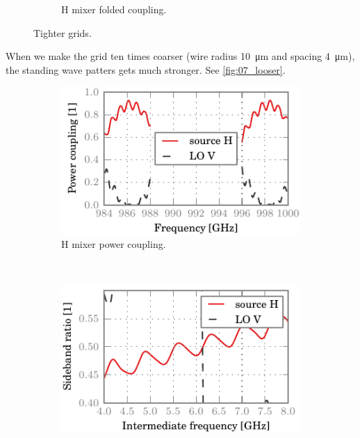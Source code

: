 \begin{figure}[hbtp]
\begin{subfigure}[b]{.5\textwidth}
        \caption{H mixer folded coupling.}
    \end{subfigure}%
    \caption{Tighter grids.}
    \label{fig:06_tighter}
\end{figure}

When we make the grid ten times coarser (wire radius \SI{10}{\micro\meter} and spacing \SI{4}{\micro\meter}), the standing wave patters gets much stronger.
See \cref{fig:07_looser}.

\begin{figure}[hbtp]
    \centering
    \begin{subfigure}[b]{.5\textwidth}
        \includegraphics{chapter_3/07_looser_h_dsb}%
        \caption{H mixer power coupling.}
    \end{subfigure}%
    \\
    \begin{subfigure}[b]{.5\textwidth}
        \includegraphics{chapter_3/07_looser_h_sbr}%

\end{subfigure}
\end{figure}
